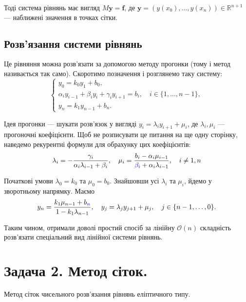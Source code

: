 \documentclass{test_template}
\begin{document}
Тоді система рівнянь має вигляд $M\mathbf{y} = \boldsymbol{f}$, де $\mathbf{y} =
(y(x_0),\dots,y(x_n)) \in \mathbb{R}^{n+1}$ --- наближені значення в точках
сітки.

\subsection{Розв'язання системи рівнянь}

Це рівняння можна розв'язати за допомогою методу прогонки (тому і метод 
називається так само). Скоротимо позначення і розглянемо таку систему:
\begin{equation*}
    \begin{cases}
        y_0 = k_0y_1 + b_0, \\
        \alpha_iy_{i-1} + \beta_iy_i + \gamma_iy_{i+1} = b_i, \quad i \in \{1,\dots,n-1\}, \\
        y_n = k_1y_{n-1} + b_n.
    \end{cases}
\end{equation*}

Ідея прогонки --- шукати розв'язок у вигляді $y_i = \lambda_iy_{i+1} + \mu_i$, 
де $\lambda_i,\mu_i$ --- прогоночні коефіцієнти. Щоб не розписувати 
це питання на ще одну сторінку, наведемо рекурентні формули для
обрахунку цих коефіцієнтів:
\begin{equation*}
    \lambda_i = -\frac{\gamma_i}{\alpha_i\lambda_{i-1} + \beta_i}, \quad 
    \mu_i = \frac{b_i - \alpha_i\mu_{i-1}}{\textcolor{blue}{\beta_i}+\alpha_i\lambda_{i-1}}, \quad i \neq 1,n
\end{equation*}

Початкові умови $\lambda_0=k_0$ та $\mu_0 = b_0$. Знайшовши усі $\lambda_i$ та $\mu_i$,
йдемо у зворотньому напрямку. Маємо
\begin{equation*}
    y_n = \frac{k_1\mu_{n-1} + b_{\textcolor{blue}{n}}}{1 - k_1\lambda_{n-1}}, \quad y_j = \lambda_jy_{j+1} + \mu_j, \quad j \in \{n-1,\dots,0\}.
\end{equation*}

Таким чином, отримали доволі простий спосіб за лінійну $\mathcal{O}(n)$ 
складність розв'язати спеціальний вид лінійної системи рівнянь.

\newpage

\section{Задача 2. Метод сіток.}

\begin{problem}
    Метод сіток чисельного розв'язання рівнянь еліптичного типу.
\end{problem}
\end{document}
